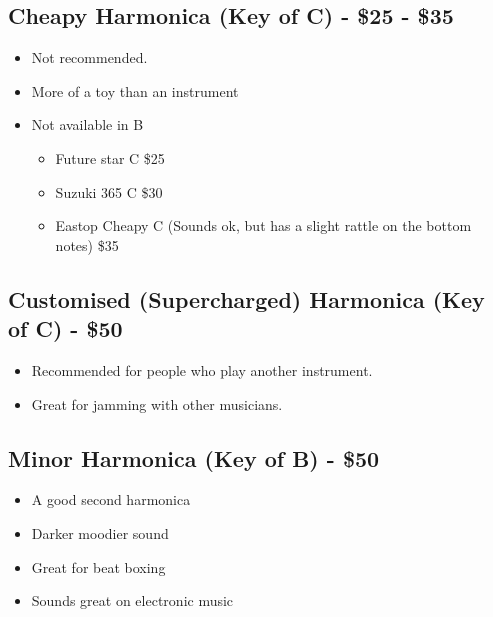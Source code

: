         \subsection*{Cheapy Harmonica (Key of C) - \$25 - \$35}
            \begin{itemize}
                \item Not recommended. 
                \item More of a toy than an instrument
                \item Not available in B
                \begin{itemize}
                    \item Future star C	\$25
                    \item Suzuki 365 C \$30
                    \item Eastop Cheapy C (Sounds ok, but has a slight rattle on the bottom notes) \$35
                \end{itemize}
                
            \end{itemize} 
            
        \subsection*{Customised (Supercharged) Harmonica (Key of C) - \$50}
            \begin{itemize}
                \item Recommended for people who play another instrument.
                \item Great for jamming with other musicians.
            \end{itemize}
            
        \subsection*{Minor Harmonica (Key of B) - \$50}
            \begin{itemize}
                \item A good second harmonica
                \item Darker moodier sound
                \item Great for beat boxing
                \item Sounds great on electronic music
            \end{itemize} 
